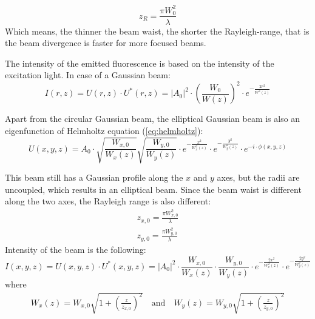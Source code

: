     \begin{equation}
      z_R = \frac{\pi W_0^2}{\lambda}
    \end{equation}
    Which means, the thinner the beam waist, the shorter the Rayleigh-range, that is the beam divergence is faster for more focused beams.

    The intensity of the emitted fluorescence is based on the intensity of the excitation light. In case of a Gaussian beam:
    \begin{equation}
      I(r,z) = U(r,z)\cdot U^*(r,z) = |A_0|^2 \cdot \left( \frac{W_0}{W(z)}\right)^2 \cdot e^{-\frac{2r^2}{W^2(z)}}
    \end{equation}

    Apart from the circular Gaussian beam, the elliptical Gaussian beam is also an eigenfunction of Helmholtz equation (\ref{eq:helmholtz}):
    \begin{equation}
      U(x,y,z) = A_0 \cdot \sqrt{\frac{W_{x,0}}{W_x(z)}} \sqrt{\frac{W_{y,0}}{W_y(z)}} \cdot e^{-\frac{x^2}{W_x^2(z)}} \cdot e^{-\frac{y^2}{W_y^2(z)}} \cdot e^{-i\cdot \phi(x,y,z)}
    \end{equation}

    This beam still has a Gaussian profile along the $x$ and $y$ axes, but the radii are uncoupled, which results in an elliptical beam. Since the beam waist is different along the two axes, the Rayleigh range is also different:
    \begin{align}
      z_{x,0} = \frac{\pi W_{x,0}^2}{\lambda} \\
      z_{y,0} = \frac{\pi W_{y,0}^2}{\lambda}
    \end{align}
    Intensity of the beam is the following:
    \begin{equation}
      I(x,y,z) = U(x,y,z)\cdot U^*(x,y,z) = |A_0|^2 \cdot \frac{W_{x,0}}{W_x(z)} \cdot \frac{W_{y,0}}{W_y(z)} \cdot e^{-\frac{2x^2}{W_x^2(z)}} \cdot e^{-\frac{2y^2}{W_y^2(z)}}
    \end{equation}
    where
    \begin{align}
      W_x(z) = W_{x,0}\sqrt{1+\left( \frac{z}{z_{x,0}} \right)^2}\mathrm{\quad and \quad } W_y(z) = W_{y,0}\sqrt{1+\left( \frac{z}{z_{y,0}} \right)^2}
    \end{align}
    
